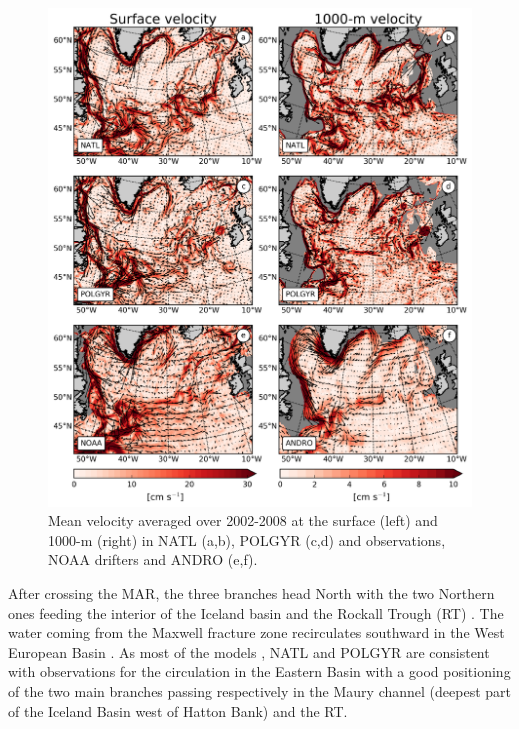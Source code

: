 \documentclass[os, manuscript]{copernicus}
\begin{document}
\begin{figure}[t]
\includegraphics[width=15cm]{../fig_os/f03.pdf}
\caption{Mean velocity averaged over 2002-2008 at the surface (left) and 1000-m (right) in NATL (a,b), POLGYR (c,d) and observations, NOAA drifters and ANDRO (e,f).}
\label{f03}
\end{figure}


After crossing the MAR, the three branches head North with the two Northern ones feeding the interior of the Iceland basin and the Rockall Trough (RT) \citep{daniault2016}. The water coming from the Maxwell fracture zone recirculates southward in the West European Basin \citep{paillet1997}. As most of the models \citep{treguier2005,deshayes2007}, NATL and POLGYR are consistent with observations for the circulation in the Eastern Basin  with a good positioning of the two main branches passing respectively in the Maury channel (deepest part of the Iceland Basin west of Hatton Bank) and the RT. 
\end{document}
